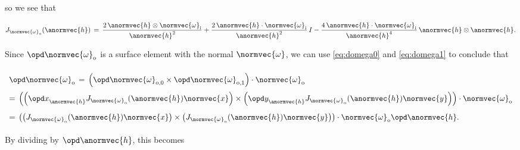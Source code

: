 so we see that

\begin{equation}
J_{\normvec{\omega}_{\text{o}}}(\anormvec{h}) \,=\,
\frac{2\,\anormvec{h}\otimes\normvec{\omega}_{\text{i}}}{\anormvec{h}^2} +
\frac{2\,\anormvec{h}\cdot\normvec{\omega}_{\text{i}}}{\anormvec{h}^2}\,I -
\frac{4\,\anormvec{h}\cdot\normvec{\omega}_{\text{i}}}{\anormvec{h}^4}\,\anormvec{h}\otimes\anormvec{h}.
\end{equation}

Since $\opd\normvec{\omega}_{\text{o}}$ is a surface element with the normal $\normvec{\omega}$, we can use  \eqref{eq:domega0} and \eqref{eq:domega1} to conclude that 

\begin{equation} \label{eq:domega}
\renewcommand*{\arraystretch}{2}
\begin{array}{l}
\displaystyle \opd\normvec{\omega}_{\text{o}} \,=\, \left(\opd\normvec{\omega}_{\text{o},0}\times\opd\normvec{\omega}_{\text{o},1}\right)\cdot\normvec{\omega}_{\text{o}} \\
=\, \left(\left(\opd x_{\anormvec{h}}^{\,}J_{\normvec{\omega}_{\text{o}}}(\anormvec{h})\normvec{x}\right)\times\left(\opd y_{\anormvec{h}}^{\,}J_{\normvec{\omega}_{\text{o}}}(\anormvec{h})\normvec{y}\right)\right)\cdot\normvec{\omega}_{\text{o}} \\
=\, \left(\left(J_{\normvec{\omega}_{\text{o}}}(\anormvec{h})\normvec{x}\right)\times\left(J_{\normvec{\omega}_{\text{o}}}(\anormvec{h})\normvec{y}\right)\right)\cdot\normvec{\omega}_{\text{o}}\opd\anormvec{h}.
\end{array}
\end{equation}

By dividing by $\opd\anormvec{h}$, this becomes

